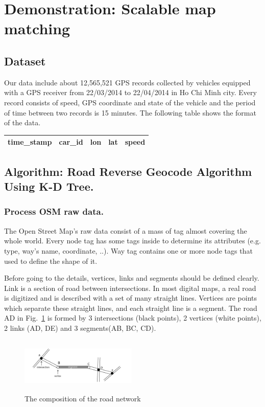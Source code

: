 \documentclass{acm_proc_article-sp}
\begin{document}
\section{Demonstration: Scalable map matching}
\subsection{Dataset}
Our data include about 12,565,521 GPS records collected by vehicles equipped with a GPS receiver from 22/03/2014 to 22/04/2014 in Ho Chi Minh city. Every record consists of speed, GPS coordinate and state of the vehicle and the period of time between two records is 15 minutes. The following table shows the format of the data.

\begin{table}[h]
\centering
\begin{tabular}{|c|c|c|c|c|}
\hline
\textbf{time\_stamp} & \textbf{car\_id} & \textbf{lon}   & \textbf{lat} & \textbf{speed} \\ \hline
\end{tabular}
\end{table}

\subsection{Algorithm: Road Reverse Geocode Algorithm Using K-D Tree.}	
	
\subsubsection{Process OSM raw data.}
	The Open Street Map's raw data consist of a mass of tag almost covering the whole world. Every node tag has some tags inside to determine its attributes (e.g. type, way's name, coordinate, ..). Way tag contains one or more node tags that used to define the shape of it.
	
		\setlength{\parindent}{0.7cm} Before going to the details, vertices, links and segments should be defined clearly. Link is a section of road between intersections. In most digital maps, a real road is digitized and is described with a set of many straight lines. Vertices are points which separate these straight lines, and each straight line is a segment. The road AD in Fig.~\ref{fig:composition} is formed by 3 intersections (black points), 2 vertices (white points), 2 links (AD, DE) and 3 segments(AB, BC, CD).
		
\begin{figure}[h]
\centering
\includegraphics[height=100px,width=210px]{figure1}
\caption{The composition of the road network}
\label{fig:composition}
\end{figure}
	
\end{document}
